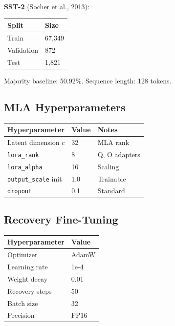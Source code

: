\textbf{SST-2} (Socher et al., 2013):

\begin{table}[H]
\centering
\small
\begin{tabular}{ll}
\toprule
\textbf{Split} & \textbf{Size} \\
\midrule
Train & 67,349 \\
Validation & 872 \\
Test & 1,821 \\
\bottomrule
\end{tabular}
\end{table}

Majority baseline: 50.92\%. Sequence length: 128 tokens.

\subsection{MLA Hyperparameters}

\begin{table}[H]
\centering
\small
\begin{tabular}{lll}
\toprule
\textbf{Hyperparameter} & \textbf{Value} & \textbf{Notes} \\
\midrule
Latent dimension $c$ & 32 & MLA rank \\
\texttt{lora\_rank} & 8 & Q, O adapters \\
\texttt{lora\_alpha} & 16 & Scaling \\
\texttt{output\_scale} init & 1.0 & Trainable \\
\texttt{dropout} & 0.1 & Standard \\
\bottomrule
\end{tabular}
\end{table}

\subsection{Recovery Fine-Tuning}

\begin{table}[H]
\centering
\small
\begin{tabular}{ll}
\toprule
\textbf{Hyperparameter} & \textbf{Value} \\
\midrule
Optimizer & AdamW \\
Learning rate & 1e-4 \\
Weight decay & 0.01 \\
Recovery steps & 50 \\
Batch size & 32 \\
Precision & FP16 \\
\bottomrule
\end{tabular}
\end{table}

